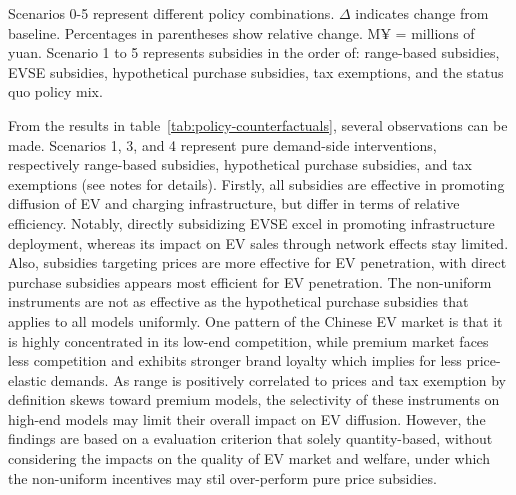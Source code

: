 \documentclass[12pt]{article}
\begin{document}
\begin{table}[!htbp]
\centering
\caption{Policy Counterfactuals}
\label{tab:policy-counterfactuals}
\vspace{0.3em}
\parbox{\textwidth}{\tiny Scenarios 0-5 represent different policy combinations. $\Delta$ indicates change from baseline. Percentages in parentheses show relative change. M¥ = millions of yuan. 
Scenario 1 to 5 represents subsidies in the order of: range-based subsidies, EVSE subsidies, hypothetical purchase subsidies, tax exemptions, and the status quo policy mix.}
\end{table}

From the results in table~\ref{tab:policy-counterfactuals}, several observations can be made.
Scenarios 1, 3, and 4 represent pure demand-side interventions, respectively range-based subsidies, hypothetical purchase subsidies, and tax exemptions (see notes for details).
Firstly, all subsidies are effective in promoting diffusion of EV and charging infrastructure, but differ in terms of relative efficiency.
Notably, directly subsidizing EVSE excel in promoting infrastructure deployment, whereas its impact on EV sales through network effects stay limited.
Also, subsidies targeting prices are more effective for EV penetration, with direct purchase subsidies appears most efficient for EV penetration.
The non-uniform instruments are not as effective as the hypothetical purchase subsidies that applies to all models uniformly.
One pattern of the Chinese EV market is that it is highly concentrated in its low-end competition, 
while premium market faces less competition and exhibits stronger brand loyalty which implies for less price-elastic demands.
As range is positively correlated to prices and tax exemption by definition skews toward premium models,
the selectivity of these instruments on high-end models may limit their overall impact on EV diffusion.
However, the findings are based on a evaluation criterion that solely quantity-based, without considering the impacts on the quality of EV market and welfare,
under which the non-uniform incentives may stil over-perform pure price subsidies.
\end{document}

